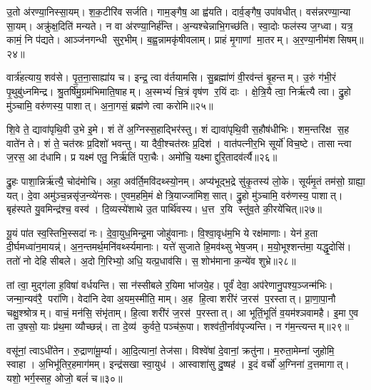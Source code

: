 उ॒तो अ॑रण्या॒निस्सा॒यम्। श॒क॒टीरि॑व सर्जति। गाम॒ङ्गैष॒ आ ह्व॑यति। दार्व॒ङ्गैष॒ उपा॑वधीत्। वस॑न्नरण्या॒न्या सा॒यम्। अक्रु॑क्ष॒दिति॑ मन्यते। न वा अ॑रण्या॒निर्\mbox{}ह॑न्ति। अ॒न्यश्चेन्नाभि॒गच्छ॑ति। स्वा॒दोः फल॑स्य ज॒ग्ध्वा। यत्र॒ कामं॒ नि प॑द्यते। आञ्ज॑नगन्धी सुर॒भीम्। ब॒ह्व॒न्नामकृ॑षीवलाम्। प्राहं मृ॒गाणां मा॒तरम्। अ॒र॒ण्या॒नीम॑शसिषम्॥२४॥\anuvakamend[स्या॒म॒ रु॒रो॒ह॒ यु॒वा॒न॒श्शु॒न्ध्यूरि॒च्छमा॑नो दृश्यते॒ निप॑द्यते च॒त्वारि॑ च]

वार्त्र॑हत्याय॒ शव॑से। पृ॒त॒ना॒साह्या॑य च। इन्द्र॒ त्वा व॑र्तयामसि। सु॒ब्रह्मा॑णं वी॒रव॑न्तं बृ॒हन्तम्। उ॒रुं ग॑भी॒रं पृ॒थुबु॑ध्नमिन्द्र। श्रु॒तर्\mbox{}षि॑मु॒ग्रम॑भिमाति॒षाहम्। अ॒स्मभ्यं॑ चि॒त्रं वृष॑ण र॒यिं दाः। क्षे॒त्रि॒यै त्वा॒ निर्\mbox{}ऋ॑त्यै त्वा। द्रु॒हो मु॑ञ्चामि॒ वरु॑णस्य॒ पाशात्। अ॒ना॒गसं॒ ब्रह्म॑णे त्वा करोमि॥२५॥

शि॒वे ते॒ द्यावा॑पृथि॒वी उ॒भे इ॒मे। शं ते॑ अ॒ग्निस्स॒हाद्भिर॑स्तु। शं द्यावा॑पृथि॒वी स॒हौष॑धीभिः। शम॒न्तरि॑क्ष स॒ह वाते॑न ते। शं ते॒ चत॑स्रः प्र॒दिशो॑ भवन्तु। या दैवी॒श्चत॑स्रः प्र॒दिश॑। वात॑पत्नीर॒भि सूर्यो॑ विच॒ष्टे। तासान्त्वा ज॒रस॒ आ द॑धामि। प्र यक्ष्म॑ एतु॒ निर्\mbox{}ऋ॑तिं परा॒चैः। अमो॑चि॒ यक्ष्माद्दुरि॒तादव॑र्त्यै॥२६॥

द्रु॒हः पाशा॒न्निर्\mbox{}ऋ॑त्यै॒ चोद॑मोचि। अहा॒ अव॑र्ति॒मवि॑दथ्स्यो॒नम्। अप्य॑भूद्भ॒द्रे सु॑कृ॒तस्य॑ लो॒के। सूर्य॑मृ॒तं तम॑सो॒ ग्राह्या॒ यत्। दे॒वा अमु॑ञ्च॒न्नसृ॑ज॒न्व्ये॑नसः। ए॒वम॒हमि॒मं क्षेत्रि॒याज्जा॑मिश॒सात्। द्रु॒हो मु॑ञ्चामि॒ वरु॑णस्य॒ पाशात्। बृह॑स्पते यु॒वमिन्द्र॑श्च॒ वस्व॑। दि॒व्यस्ये॑शाथे उ॒त पार्थि॑वस्य। ध॒त्त र॒यि स्तु॑व॒ते की॒रये॑चित्॥२७॥

यू॒यं पा॑त स्व॒स्तिभि॒स्सदा॑ नः। दे॒वा॒युध॒मिन्द्र॒मा जोहु॑वानाः। वि॒श्वा॒वृध॑म॒भि ये रक्ष॑माणाः। येन॑ ह॒ता दी॒र्घमध्वा॑न॒मायन्न्॑। अ॒न॒न्तमर्थ॒मनि॑वर्थ्स्यमानाः। यत्ते॑ सुजाते हि॒मव॑थ्सु भेष॒जम्। म॒यो॒भूश्शन्त॑मा॒ यद्धृ॒दोसि॑। ततो॑ नो देहि सीबले। अ॒दो गि॒रिभ्यो॒ अधि॒ यत्प्र॒धाव॑सि। स॒शोभ॑माना क॒न्ये॑व शुभ्रे॥२८॥

तां त्वा॒ मुद्ग॑ला ह॒विषा॑ वर्धयन्ति। सा न॑स्सीबले र॒यिमा भा॑जये॒ह। पूर्वं॑ देवा॒ अप॑रेणानु॒पश्य॒ञ्जन्म॑भिः। जन्मा॒न्यव॑रै॒ परा॑णि। वेदा॑नि देवा अ॒यम॒स्मीति॒ माम्। अ॒ह हि॒त्वा शरी॑रं ज॒रस॑ प॒रस्तात्। प्रा॒णा॒पा॒नौ चक्षु॒श्श्रोत्रम्। वाचं॒ मन॑सि॒ संभृ॑ताम्। हि॒त्वा शरी॑रं ज॒रस॑ प॒रस्तात्। आ भूतिं॒भूतिं॑ व॒यम॑श्ञवामहै। इ॒मा ए॒व ता उ॒षसो॒ याः प्र॑थ॒मा व्यौच्छन्न्॑। ता दे॒व्य॑ कुर्वते॒ पञ्च॑रू॒पा। शश्व॑ती॒र्नाव॑पृज्यन्ति। न ग॑म॒न्त्यन्तम्॥२९॥\anuvakamend[क॒रो॒म्यव॑र्त्यै चिच्छुभ्रेऽश्ञवामहै च॒त्वारि॑ च]

वसू॑नां॒ त्वाऽधी॑तेन। रु॒द्राणा॑मू॒र्म्या। आ॒दि॒त्यानां॒ तेज॑सा। विश्वे॑षां दे॒वानां॒ क्रतु॑ना। म॒रुता॒मेम्ना॑ जुहोमि॒ स्वाहा। अ॒भिभू॑तिर॒हमाग॑मम्। इन्द्र॑सखा स्वा॒युध॑। आस्वाशा॑सु दु॒ष्षह॑। इ॒दं वर्चो॑ अ॒ग्निना॑ द॒त्तमागात्। यशो॒ भर्ग॒स्सह॒ ओजो॒ बलं॑ च॥३०॥


